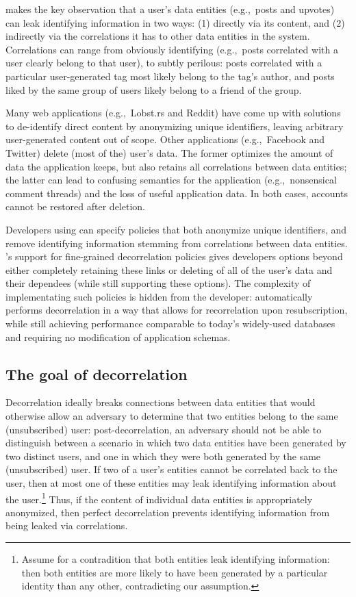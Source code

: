 \sys makes the key observation that a user's data entities (e.g.,\ posts and upvotes) can leak identifying
information in two ways: (1) directly via its content, and (2) indirectly via the correlations it has to
other data entities in the system.
Correlations can range from obviously identifying (e.g.,\ posts correlated
with a user clearly belong to that user), to subtly perilous: posts correlated with a
particular user-generated tag most likely belong to the tag's author, and posts liked by the
same group of users likely belong to a friend of the group.

Many web applications (e.g.,\ Lobst.rs and Reddit) have come up with solutions to de-identify direct
content by anonymizing unique identifiers, leaving arbitrary user-generated content out of scope.
Other applications (e.g.,\ Facebook and Twitter) delete (most of the) user's data. The former
optimizes the amount of data the application keeps, but also retains all correlations between data
entities; the latter can lead to confusing semantics for the application (e.g.,\ nonsensical comment
threads) and the loss of useful application data. In both cases, accounts cannot be restored after
deletion.

Developers using \sys can specify policies that both anonymize unique identifiers, and remove
identifying information stemming from correlations between data entities. \sys's support for
fine-grained decorrelation policies gives developers options beyond either completely retaining
these links or deleting of all of the user's data and their dependees (while still supporting
these options). The complexity of implementating such policies is hidden from the developer:
\sys automatically performs decorrelation in a way that allows for recorrelation upon
resubscription, while still achieving performance comparable to today’s widely-used databases and
requiring no modification of application schemas.

\subsection{The goal of decorrelation}
Decorrelation ideally breaks connections between data entities that would otherwise allow
an adversary to determine that two entities belong to the same (unsubscribed) user:
post-decorrelation, an adversary should not be able to distinguish between a scenario in which two data entities
have been generated by two distinct users, and one in which they were both generated by the same
(unsubscribed) user.  If two of a user's entities cannot be correlated back to the user, then at
most one of these entities may leak identifying information about the user.\footnote{Assume for a
contradition that both entities leak identifying information: then both entities are more likely to
have been generated by a particular identity than any other, contradicting our assumption.}  Thus,
if the content of individual data entities is appropriately anonymized, then perfect decorrelation prevents
identifying information from being leaked via correlations.


